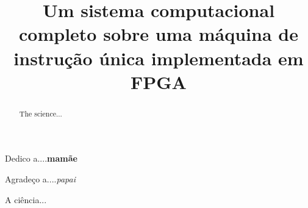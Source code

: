 \documentclass[bacharelado]{unb-cic}
\title{Um sistema computacional completo sobre uma máquina de instrução única implementada em FPGA}
\begin{document}
  \maketitle
  \pretextual

  \begin{dedicatoria}
  Dedico a....\textbf{mamãe}
  \end{dedicatoria}

  \begin{agradecimentos}
  Agradeço a....\textit{papai}
  \end{agradecimentos}

  \begin{resumo}
  A ciência...
  \end{resumo}

  \begin{abstract}
  The science...
  \end{abstract}

  \tableofcontents
  \listoffigures
  \listoftables

  \textual
  
  

  \postextual
  
  
\end{document}
